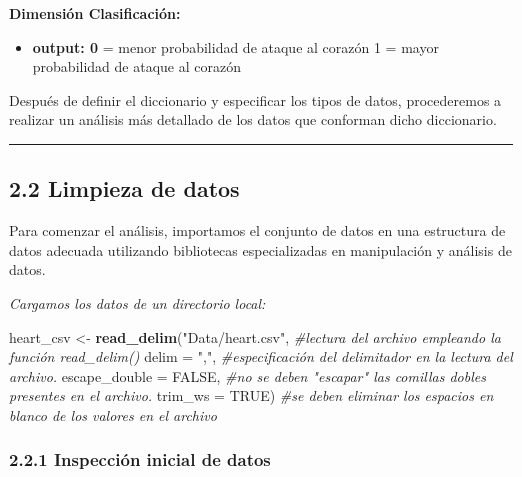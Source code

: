 \documentclass[
]{article}
\newenvironment{Shaded}{\begin{snugshade}}{\end{snugshade}}
\newcommand{\AttributeTok}[1]{\textcolor[rgb]{0.13,0.29,0.53}{#1}}
\newcommand{\CommentTok}[1]{\textcolor[rgb]{0.56,0.35,0.01}{\textit{#1}}}
\newcommand{\ConstantTok}[1]{\textcolor[rgb]{0.56,0.35,0.01}{#1}}
\newcommand{\FunctionTok}[1]{\textcolor[rgb]{0.13,0.29,0.53}{\textbf{#1}}}
\newcommand{\NormalTok}[1]{#1}
\newcommand{\OtherTok}[1]{\textcolor[rgb]{0.56,0.35,0.01}{#1}}
\newcommand{\StringTok}[1]{\textcolor[rgb]{0.31,0.60,0.02}{#1}}
\providecommand{\tightlist}{%
  \setlength{\itemsep}{0pt}\setlength{\parskip}{0pt}}
\begin{document}
\textbf{Dimensión Clasificación:}

\begin{itemize}
\tightlist
\item
  \textbf{output: 0} = menor probabilidad de ataque al corazón 1 = mayor
  probabilidad de ataque al corazón
\end{itemize}

Después de definir el diccionario y especificar los tipos de datos,
procederemos a realizar un análisis más detallado de los datos que
conforman dicho diccionario.

\begin{center}\rule{0.5\linewidth}{0.5pt}\end{center}

\hypertarget{limpieza-de-datos}{%
\subsection{2.2 Limpieza de datos}\label{limpieza-de-datos}}

Para comenzar el análisis, importamos el conjunto de datos en una
estructura de datos adecuada utilizando bibliotecas especializadas en
manipulación y análisis de datos.

\emph{Cargamos los datos de un directorio local:}

\begin{Shaded}
\begin{Highlighting}[]
\NormalTok{heart\_csv }\OtherTok{\textless{}{-}} \FunctionTok{read\_delim}\NormalTok{(}\StringTok{"Data/heart.csv"}\NormalTok{, }\CommentTok{\#lectura del archivo empleando la función read\_delim()}
            \AttributeTok{delim =} \StringTok{","}\NormalTok{, }\CommentTok{\#especificación del delimitador en la lectura del archivo.}
            \AttributeTok{escape\_double =} \ConstantTok{FALSE}\NormalTok{, }\CommentTok{\#no se deben "escapar" las comillas dobles presentes en el archivo.}
            \AttributeTok{trim\_ws =} \ConstantTok{TRUE}\NormalTok{) }\CommentTok{\#se deben eliminar los espacios en blanco de los valores en el archivo}
\end{Highlighting}
\end{Shaded}

\hypertarget{inspecciuxf3n-inicial-de-datos}{%
\subsubsection{2.2.1 Inspección inicial de
datos}\label{inspecciuxf3n-inicial-de-datos}}
\end{document}
